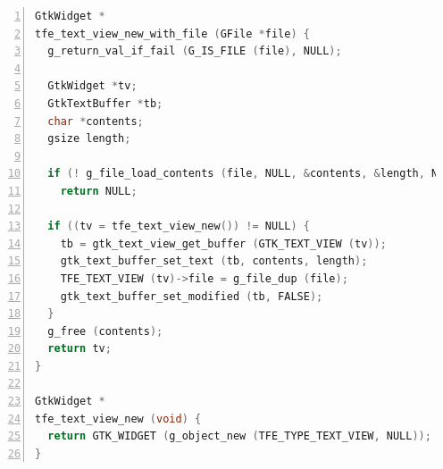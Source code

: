 \begin{lstlisting}[language=C, numbers=left]
GtkWidget *
tfe_text_view_new_with_file (GFile *file) {
  g_return_val_if_fail (G_IS_FILE (file), NULL);

  GtkWidget *tv;
  GtkTextBuffer *tb;
  char *contents;
  gsize length;

  if (! g_file_load_contents (file, NULL, &contents, &length, NULL, NULL)) /* read error */
    return NULL;

  if ((tv = tfe_text_view_new()) != NULL) {
    tb = gtk_text_view_get_buffer (GTK_TEXT_VIEW (tv));
    gtk_text_buffer_set_text (tb, contents, length);
    TFE_TEXT_VIEW (tv)->file = g_file_dup (file);
    gtk_text_buffer_set_modified (tb, FALSE);
  }
  g_free (contents);
  return tv;
}

GtkWidget *
tfe_text_view_new (void) {
  return GTK_WIDGET (g_object_new (TFE_TYPE_TEXT_VIEW, NULL));
}
\end{lstlisting}


